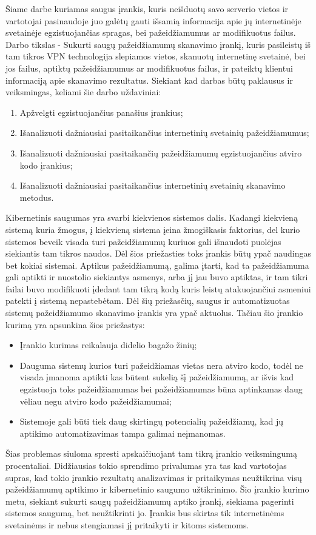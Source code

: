 Šiame darbe kuriamas saugus įrankis, kuris neišduotų savo serverio vietos ir vartotojai pasinaudoje juo galėtų gauti išsamią informacija apie jų internetinėje svetainėje egzistuojančias spragas,
bei pažeidžiamumus ar modifikuotus failus. Darbo tikslas - Sukurti saugų pažeidžiamumų skanavimo įrankį, kuris pasileistų iš tam tikros VPN technologija slepiamos vietos, skanuotų internetinę
svetainė, bei jos failus, aptiktų pažeidžiamumus ar modifikuotus failus, ir pateiktų klientui informaciją apie skanavimo rezultatus. Siekiant kad darbas būtų paklausus ir veiksmingas, keliami šie
darbo uždaviniai:
\begin{enumerate}
  \item Apžvelgti egzistuojančius panašius įrankius;
  \item Išanalizuoti dažniausiai pasitaikančius internetinių svetainių pažeidžiamumus;
  \item Išanalizuoti dažniausiai pasitaikančių pažeidžiamumų egzistuojančius atviro kodo įrankius;
  \item Išanalizuoti dažniausiai pasitaikančius internetinių svetainių skanavimo metodus.
\end{enumerate}
Kibernetinis saugumas yra svarbi kiekvienos sistemos dalis. Kadangi kiekvieną sistemą kuria
žmogus, į kiekvieną sistema įeina žmogiškasis faktorius, del kurio sistemos beveik visada turi
pažeidžiamumų kuriuos gali išnaudoti puolėjas siekiantis tam tikros naudos. Dėl šios priežasties
toks įrankis būtų ypač naudingas bet kokiai sistemai. Aptikus pažeidžiamumą, galima įtarti, kad
ta pažeidžiamuma gali aptikti ir nuostolio siekiantys asmenys, arba jį jau buvo aptiktas, ir tam tikri
failai buvo modifikuoti įdedant tam tikrą kodą kuris leistų atakuojančiui asmeniui patekti į sistemą
nepastebėtam.
Dėl šių priežasčių, saugus ir automatizuotas sistemų pažeidžiamumo skanavimo įrankis yra
ypač aktuolus. Tačiau šio įrankio kurimą yra apsunkina šios priežastys:
\begin{itemize}
  \item Įrankio kurimas reikalauja didelio bagažo žinių;
  \item Dauguma sistemų kurios turi pažeidžiamas vietas nera atviro kodo, todėl ne visada įmanoma
aptikti kas būtent sukelią šį pažeidžiamumą, ar išvis kad egzistuoja toks pažeidžiamumas bei
pažeidžiamumas būna aptinkamas daug vėliau negu atviro kodo pažeidžiamumai;
  \item Sistemoje gali būti tiek daug skirtingų potencialių pažeidžiamų, kad jų aptikimo automatizavimas tampa galimai neįmanomas.
\end{itemize}
Šias problemas siuloma spresti apskaičiuojant tam tikrą įrankio veiksmingumą procentaliai.
Didžiausias tokio sprendimo privalumas yra tas kad vartotojas supras, kad tokio įrankio rezultatų
analizavimas ir pritaikymas neužtikrina visų pažeidžiamumų aptikimo ir kibernetinio saugumo
užtikrinimo.
Šio įrankio kurimo metu, siekiant sukurti saugų pažeidžiamumų aptiko įrankį, siekiama pagerinti sistemos saugumą, bet neužtikrinti jo. Įrankis bus skirtas tik internetinėms svetainėms ir
nebus stengiamasi jį pritaikyti ir kitoms sistemoms.